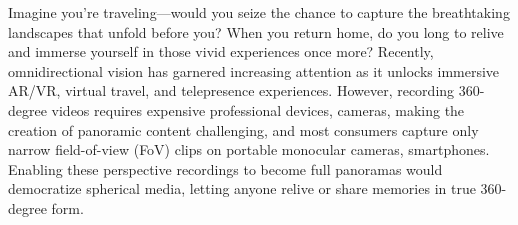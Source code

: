 %
%

Imagine you're traveling—would you seize the chance to capture the breathtaking landscapes that unfold before you? When you return home, do you long to relive and immerse yourself in those vivid experiences once more?
%
Recently, omnidirectional vision has garnered increasing attention as it unlocks immersive AR/VR, virtual travel, and telepresence experiences.
%
However, recording 360-degree videos requires expensive professional devices,  cameras, making the creation of panoramic content challenging, and most consumers capture only narrow field-of-view (FoV) clips on portable monocular cameras, \eg smartphones.
%
Enabling these perspective recordings to become full panoramas would democratize spherical media, letting anyone relive or share memories in true 360-degree form.
%

